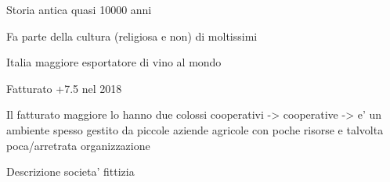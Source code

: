 Storia antica quasi 10000 anni 

Fa parte della cultura (religiosa e non) di moltissimi

Italia maggiore esportatore di vino al mondo

Fatturato +7.5 nel 2018 

Il fatturato maggiore lo hanno due colossi cooperativi -> cooperative -> e' un ambiente spesso gestito da piccole aziende agricole 
con poche risorse e talvolta poca/arretrata organizzazione

Descrizione societa' fittizia 